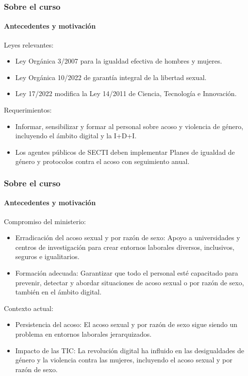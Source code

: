 \documentclass{beamer}
\newcommand{\highlight}[1]{{\color{Blue} #1}}
\begin{document}
    \begin{frame}
		\frametitle{Sobre el curso}
        \framesubtitle{Antecedentes y motivación}
            Leyes relevantes:
            \begin{itemize}
            \item \highlight{Ley Orgánica 3/2007} para la igualdad efectiva de hombres y mujeres.
            \item \highlight{Ley Orgánica 10/2022} de garantía integral de la libertad sexual.
            \item \highlight{Ley 17/2022} modifica la Ley 14/2011 de Ciencia, Tecnología e Innovación.
            \end{itemize}
            Requerimientos:
            \begin{itemize}
            \item \highlight{Informar, sensibilizar y formar} al personal sobre acoso y violencia de género, incluyendo el ámbito digital y la I+D+I.
            \item Los agentes públicos de SECTI deben implementar \highlight{Planes de igualdad de género} y protocolos contra el acoso con seguimiento anual.
            \end{itemize}
    \end{frame}

    \begin{frame}
		\frametitle{Sobre el curso}
        \framesubtitle{Antecedentes y motivación}
            Compromiso del ministerio:
            \begin{itemize}
            \item \highlight{Erradicación del acoso sexual y por razón de sexo}: Apoyo a universidades y centros de investigación para crear entornos laborales diversos, inclusivos, seguros e igualitarios.
            \item \highlight{Formación adecuada}: Garantizar que todo el personal esté capacitado para prevenir, detectar y abordar situaciones de acoso sexual o por razón de sexo, también en el ámbito digital.
            \end{itemize}
            Contexto actual:
            \begin{itemize}
            \item \highlight{Persistencia del acoso}: El acoso sexual y por razón de sexo sigue siendo un problema en entornos laborales jerarquizados.
            \item \highlight{Impacto de las TIC}: La revolución digital ha influido en las desigualdades de género y la violencia contra las mujeres, incluyendo el acoso sexual y por razón de sexo.
            \end{itemize}
    \end{frame}
\end{document}
